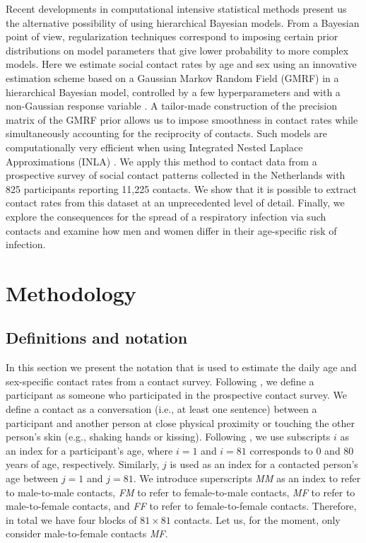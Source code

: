 \documentclass[aoas,preprint]{imsart}
\numberwithin{equation}{section}
\begin{document}
Recent developments in computational intensive statistical methods present us the alternative possibility of using hierarchical Bayesian models. From a Bayesian point of view, regularization techniques correspond to imposing certain prior distributions on model parameters that give lower probability to more complex models. Here we estimate social contact rates by age and sex using an innovative estimation scheme based on a Gaussian Markov Random Field (GMRF) in a hierarchical Bayesian model, controlled by a few hyperparameters and with a non-Gaussian response variable \citep{rue_gaussian_2005}. A tailor-made construction of the precision matrix of the GMRF prior allows us to impose smoothness in contact rates while simultaneously accounting for the reciprocity of contacts. Such models are computationally very efficient when using Integrated Nested Laplace Approximations (INLA) \citep{rue_approximate_2009}. We apply this method to contact data from a prospective survey of social contact patterns collected in the Netherlands with 825 participants reporting 11,225 contacts. We show that it is possible to extract contact rates from this dataset at an unprecedented level of detail. Finally, we explore the consequences for the spread of a respiratory infection via such contacts and examine how men and women differ in their age-specific risk of infection.

\section{Methodology}

\subsection{Definitions and notation}

In this section we present the notation that is used to estimate the daily age and sex-specific contact rates from a contact survey. Following \cite{mossong_social_2008}, we define a participant as someone who participated in the prospective contact survey. We define a contact as a conversation (i.e., at least one sentence) between a participant and another person at close physical proximity or touching the other person's skin (e.g., shaking hands or kissing). Following \cite{hens_modeling_2012}, we use subscripts $i$ as an index for a participant's age, where $i = 1$ and $i = 81$ corresponds to 0 and 80 years of age, respectively. Similarly, $j$ is used as an index for a contacted person's age between $j = 1$ and $j = 81$. We introduce superscripts \textit{MM} as an index to refer to male-to-male contacts, \textit{FM} to refer to female-to-male contacts, \textit{MF} to refer to male-to-female contacts, and \textit{FF} to refer to female-to-female contacts. Therefore, in total we have four blocks of $81 \times 81$ contacts. Let us, for the moment, only consider male-to-female contacts \textit{MF}.
 
\end{document}
